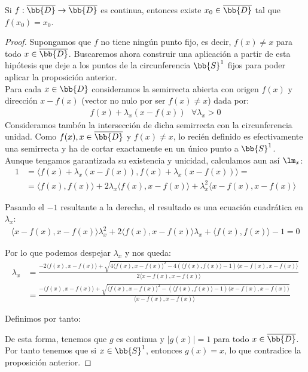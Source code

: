 \begin{teo}
    Si $f:\overline{\bb{D}} \to \overline{\bb{D}}$ es continua, entonces existe $x_0\in \overline{\bb{D}}$ tal que $f(x_0)=x_0$.

    \begin{proof}
        Supongamos que $f$ no tiene ningún punto fijo, es decir, $f(x)\neq x$ para todo $x\in \overline{\bb{D}}$. Buscaremos ahora construir una aplicación a partir de esta hipótesis que deje a los puntos de la circunferencia $\bb{S}^1$ fijos para poder aplicar la proposición anterior. \\

        Para cada $x\in \bb{D}$ consideramos la semirrecta abierta con origen $f(x)$ y dirección $x-f(x)$ (vector no nulo por ser $f(x)\neq x$) dada por:
        \begin{gather*}
            f(x) + \lambda_x (x-f(x))\ \ \ \forall \lambda_x >0
        \end{gather*}
        Consideramos tambén la intersección de dicha semirrecta con la circunferencia unidad. Como $f(x),x\in \overline{\bb{D}}$ y $f(x)\neq x$, lo recién definido es efectivamente una semirrecta y ha de cortar exactamente en un único punto a $\bb{S}^1$. Aunque tengamos garantizada su existencia y unicidad, calculamos aun así $\lm_x$:
        \begin{align*}
            1 &= \langle f(x) + \lambda_x (x-f(x)), f(x) + \lambda_x (x-f(x)) \rangle =\\
            &=\langle f(x),f(x) \rangle + 2\lambda_x \langle f(x), x-f(x)\rangle + \lambda_x^2 \langle x-f(x), x-f(x) \rangle
        \end{align*}

        Pasando el $-1$ resultante a la derecha, el resultado es una ecuación cuadrática en $\lambda_x$:
        \begin{gather*}
            \langle x-f(x), x-f(x) \rangle \lambda_x^2 + 2\langle f(x), x-f(x) \rangle \lambda_x + \langle f(x),f(x)\rangle -1 = 0
        \end{gather*}

        Por lo que podemos despejar $\lambda_x$ y nos queda:
        \begin{align*}
            \lambda_x &= \frac{-2\langle f(x), x-f(x) \rangle + \sqrt{4\langle f(x), x-f(x)\rangle^2 - 4(\langle f(x),f(x)\rangle -1)\langle x-f(x), x-f(x)\rangle}}{2\langle x-f(x), x-f(x) \rangle}\\
            &= \frac{-\langle f(x), x-f(x) \rangle + \sqrt{\langle f(x), x-f(x)\rangle^2 - (\langle f(x),f(x)\rangle-1)\langle x-f(x), x-f(x)\rangle}}{\langle x-f(x), x-f(x) \rangle}
        \end{align*}

        Definimos por tanto:

        De esta forma, tenemos que $g$ es continua y $|g(x)|=1$ para todo $x\in \overline{\bb{D}}$. Por tanto tenemos que si $x\in \bb{S}^1$, entonces $g(x)=x$, lo que contradice la proposición anterior.
    \end{proof}
\end{teo}

